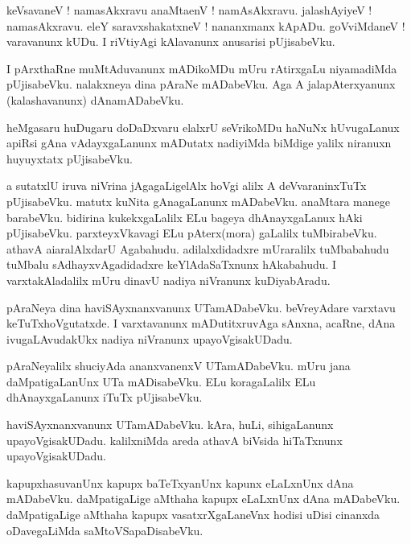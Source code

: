 \documentclass{article}
\begin{document}
\begin{mn}%
keVsavaneV ! namasAkxravu anaMtaenV ! namAsAkxravu. jalashAyiyeV ! namasAkxravu. eleY 
saravxshakatxneV ! nananxmanx kApADu. goVviMdaneV ! varavanunx kUDu. I riVtiyAgi kAlavanunx 
anusarisi pUjisabeVku.
\end{mn}

\begin{mn}%
I pArxthaRne muMtAduvanunx mADikoMDu mUru rAtirxgaLu niyamadiMda pUjisabeVku. nalakxneya dina 
pAraNe mADabeVku. Aga A jalapAterxyanunx (kalashavanunx) dAnamADabeVku.
\end{mn}

\begin{mn}%
heMgasaru huDugaru doDaDxvaru elalxrU seVrikoMDu haNuNx hUvugaLanux apiRsi gAna vAdayxgaLanunx 
mADutatx nadiyiMda biMdige yalilx niranuxn huyuyxtatx pUjisabeVku.
\end{mn}

\begin{mn}%
a sutatxlU iruva niVrina jAgagaLigelAlx hoVgi alilx A deVvaraninxTuTx pUjisabeVku. matutx kuNita 
gAnagaLanunx mADabeVku. anaMtara manege barabeVku. bidirina kukekxgaLalilx ELu bageya 
dhAnayxgaLanux hAki pUjisabeVku. parxteyxVkavagi ELu pAterx(mora) gaLalilx tuMbirabeVku. athavA 
aiaralAlxdarU Agabahudu. adilalxdidadxre mUraralilx tuMbabahudu tuMbalu sAdhayxvAgadidadxre 
keYlAdaSaTxnunx hAkabahudu. I varxtakAladalilx mUru dinavU nadiya niVranunx kuDiyabAradu.
\end{mn}

\begin{mn}%
pAraNeya dina haviSAyxnanxvanunx UTamADabeVku. beVreyAdare varxtavu keTuTxhoVgutatxde. I 
varxtavanunx mADutitxruvAga sAnxna, acaRne, dAna ivugaLAvudakUkx nadiya niVranunx upayoVgisakUDadu.
\end{mn}

\begin{mn}%
pAraNeyalilx shuciyAda ananxvanenxV UTamADabeVku. mUru jana daMpatigaLanUnx UTa mADisabeVku. ELu 
koragaLalilx ELu dhAnayxgaLanunx iTuTx pUjisabeVku.
\end{mn}

\begin{mn}%
haviSAyxnanxvanunx UTamADabeVku. kAra, huLi, sihigaLanunx upayoVgisakUDadu. kalilxniMda areda 
athavA biVsida hiTaTxnunx upayoVgisakUDadu.
\end{mn}

\begin{mn}%
kapupxhasuvanUnx kapupx baTeTxyanUnx kapunx eLaLxnUnx dAna mADabeVku. daMpatigaLige aMthaha kapupx 
eLaLxnUnx dAna mADabeVku. daMpatigaLige aMthaha kapupx vasatxrXgaLaneVnx hodisi uDisi cinanxda 
oDavegaLiMda saMtoVSapaDisabeVku.
\end{mn}
\end{document}
